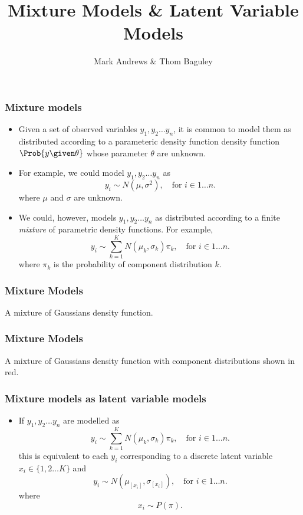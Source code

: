 \documentclass{slides}
\title[MCMC]{Mixture Models \& Latent Variable Models}
\author[Andrews]{Mark Andrews \& Thom Baguley}
\begin{document}
{
	\begin{frame}
		\titlepage
	\end{frame}
}


\begin{frame}
	\frametitle{Mixture models}
	\begin{itemize}

		\item Given a set of observed variables $y_1, y_2 \ldots y_n$,
			it is common to model them as distributed according to
			a parameteric density function density function
			$\Prob{y \given \theta}$ whose parameter $\theta$ are
			unknown.

		\item For example, we could model $y_1, y_2 \ldots y_n$ as 
			\[
				y_i \sim N(\mu, \sigma^2),\quad\text{for $i \in {1 \ldots n}$.}
			\]
		where $\mu$ and $\sigma$ are unknown.

	\item We could, however, models $y_1, y_2 \ldots y_n$ as distributed according to a finite \emph{mixture} of parametric density functions.
		For example, 
		\[
			y_i \sim \sum_{k=1}^K N(\mu_k, \sigma_k) \pi_k, \quad\text{for $i \in {1 \ldots n}$.}
		\]
	where $\pi_k$ is the probability of component distribution $k$.
	

	\end{itemize}
	\end{frame}

	\begin{frame}
	\frametitle{Mixture Models}
	\noindent A mixture of Gaussians density function.
	\vspace{-2\baselineskip}
	\begin{center}
	
	\end{center}
	\end{frame}

	\begin{frame}
	\frametitle{Mixture Models}
	\noindent A mixture of Gaussians density function with component distributions shown in red.
	\vspace{-2\baselineskip}
	\begin{center}
	
	\end{center}
	\end{frame}

	\begin{frame}
	\frametitle{Mixture models as latent variable models}
	\begin{itemize}

	\item If $y_1, y_2 \ldots y_n$ are modelled as 
		\[
			y_i \sim \sum_{k=1}^K N(\mu_k, \sigma_k) \pi_k, \quad\text{for $i \in {1 \ldots n}$.}
		\]
	this is equivalent to each $y_i$ corresponding to a discrete latent variable $x_i \in \{1, 2 \ldots K\}$ and
		\[
			y_i \sim N(\mu_{[x_i]}, \sigma_{[x_i]}),\quad\text{for $i \in {1 \ldots n}$.}
		\]
		where
		\[
			x_i \sim P(\pi).
		\]
	
	\end{itemize}
	\end{frame}
\end{document}
